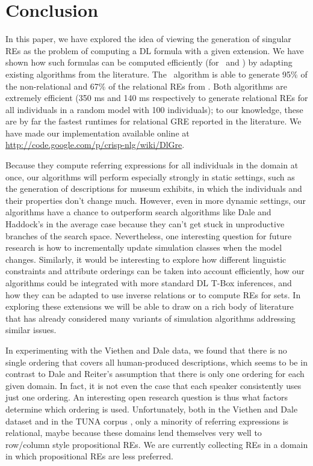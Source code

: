 \section{Conclusion} \label{sec:conclusion}

In this paper, we have explored the idea of viewing the generation of
singular REs as the problem of computing a DL formula with a given
extension.  We have shown how such formulas can be computed
efficiently (for \alc\ and \el) by adapting existing algorithms from
the literature.  The \el\ algorithm is able to generate 95\% of the
non-relational and 67\% of the relational REs from
.  Both algorithms
are extremely efficient (350 ms and 140 ms respectively to generate
relational REs for all individuals in a random model with 100
individuals); to our knowledge, these are by far the fastest runtimes
for relational GRE reported in the literature.  We have made our
implementation available online at
\url{http://code.google.com/p/crisp-nlg/wiki/DlGre}.

Because they compute referring expressions for all individuals in the
domain at once, our algorithms will perform especially strongly in
static settings, such as the generation of descriptions for museum
exhibits, in which the individuals and their properties don't change
much.  However, even in more dynamic settings, our algorithms have a
chance to outperform search algorithms like Dale and Haddock's in the
average case because they can't get stuck in unproductive branches of
the search space. Nevertheless, one interesting question for future
research is how to incrementally update simulation classes when the
model changes. Similarly, it would be interesting to explore how
different linguistic constraints and attribute orderings can be taken
into account efficiently, how our algorithms
could be integrated with more standard DL T-Box inferences, and how they
 can be adapted to use inverse relations or to compute REs
for sets. In exploring these extensions we will be able to draw on a
rich body of literature that has already considered many variants of simulation
algorithms addressing similar issues.

In experimenting with the Viethen and Dale data, we found that there
is no single ordering that covers all human-produced descriptions,
which seems to be in contrast to Dale and Reiter's
 assumption that there is only one ordering for
each given domain.  In fact, it is not even the case that each speaker
consistently uses just one ordering.  An interesting open research
question is thus what factors determine which ordering is used.
Unfortunately, both in the Viethen and Dale dataset and in the TUNA
corpus \cite{deemter06:_build_seman_trans_corpus_for}, only a minority
of referring expressions is relational, maybe because these domains
lend themselves very well to row/column style propositional REs.  We
are currently collecting REs in a domain in which propositional REs
are less preferred.

